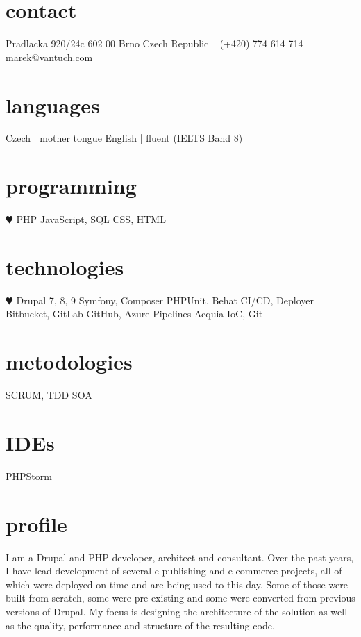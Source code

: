 \documentclass[]{friggeri-cv} %
\begin{document}


\begin{aside} %
\section{contact}
Pradlacka 920/24c
602 00 Brno
Czech Republic
~
(+420) 774 614 714
~
marek@vantuch.com
\section{languages}
Czech | mother tongue
English | fluent
(IELTS Band 8)
\section{programming}
{\color{red} $\varheartsuit$} PHP
JavaScript, SQL
CSS, HTML
\section{technologies}
{\color{red} $\varheartsuit$} Drupal 7, 8, 9
Symfony, Composer
PHPUnit, Behat
CI/CD, Deployer
Bitbucket, GitLab
GitHub, Azure Pipelines
Acquia
IoC, Git
\section{metodologies}
SCRUM, TDD
SOA
\section{IDEs}
PHPStorm
\end{aside}

\section{profile}
I am a Drupal and PHP developer, architect and consultant.
Over the past years, I have lead development of several e-publishing and e-commerce projects, all of which were deployed on-time and are being used to this day.
Some of those were built from scratch, some were pre-existing and some were converted from previous versions of Drupal.
My focus is designing the architecture of the solution as well as the quality, performance and structure of the resulting code.
\end{document}
